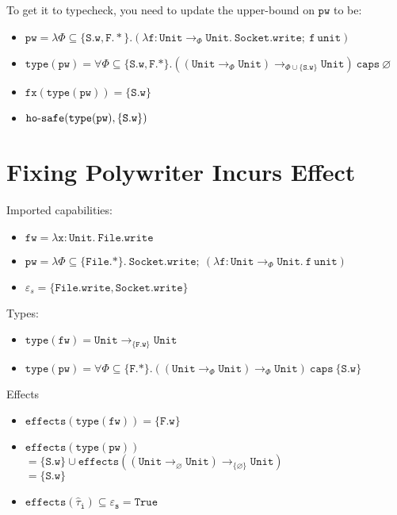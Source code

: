 \documentclass{llncs}
\newcommand{\keywadj}[1]{\mathtt{#1}}
\newcommand{\keyw}[1]{\keywadj{#1}~}
\newcommand{\kw}[1]{\keyw{ #1 }}
\newcommand{\kwa}[1]{\keywadj{ #1 }}
\newcommand{\hyphen}{\hbox{-}}
\newcommand{\Unit}[0]{ \kwa{Unit} }
\newcommand{\hosafe}[2]{ \kwa{ho \hyphen safe}(#1, #2) }
\begin{document}
\noindent
To get it to typecheck, you need to update the upper-bound on $\kwa{pw}$ to be:

\begin{itemize}
	\item $\kwa{pw = \lambda \Phi \subseteq \{\kwa{S.w, F.*} \}. (\lambda f: Unit \rightarrow_{\Phi} Unit. ~Socket.write; ~f~ unit)}$
	\item $\kwa{type(pw) = \forall \Phi \subseteq \{S.w, F.*\}. ((Unit \rightarrow_{\Phi} Unit) \rightarrow_{\Phi \cup \{S.w\}} Unit) ~\kw{caps} \varnothing}$
	\item $\kwa{fx(type(pw)) = \{S.w\}}$
	\item $\hosafe{\kwa{type(pw)}}{\kwa{\{S.w\}}}$
\end{itemize}


\section{Fixing Polywriter Incurs Effect}

Imported capabilities:
\begin{itemize}
	\item $\kwa{fw = \lambda x: Unit.~File.write}$
	\item $\kwa{pw = \lambda \Phi \subseteq \{ File.* \}.~Socket.write;~ (\lambda f: Unit \rightarrow_{\Phi} \Unit. ~f ~unit)}$
	\item $\varepsilon_s = \{\kwa{File.write, Socket.write}\}$
\end{itemize}

\noindent
Types:
\begin{itemize}
	\item $\kwa{type(fw) = \Unit \rightarrow_{\{F.w\}} \Unit}$
	\item $\kwa{type(pw) = \forall \Phi \subseteq \{F.*\}. ((Unit \rightarrow_{\Phi} Unit) \rightarrow_{\Phi} Unit) ~\kw{caps} \{S.w\}}$
\end{itemize}

\noindent
Effects
\begin{itemize}
	\item $\kwa{effects(type(fw)) = \{F.w\}}$
	\item $\kwa{effects(type(pw))}$ \\
	$\kwa{= \{ S.w \} \cup effects((Unit \rightarrow_{\varnothing} Unit) \rightarrow_{\{ \varnothing \}} Unit)}$\\
	$= \{\kwa{S.w}\}$
	\item $\kwa{effects(\hat \tau_i) \subseteq \varepsilon_s = True}$
\end{itemize}
\end{document}
